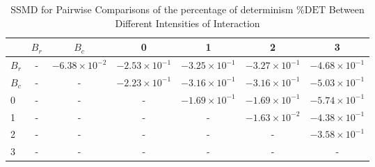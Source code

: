 \begin{table*}[!t]
\caption{SSMD for Pairwise Comparisons of the percentage of determinism $\%\text{DET}$ Between Different Intensities of Interaction\label{tab:ssmd_det}}
\centering
\begin{tabular}{lcccccc}
\toprule
 & $B_r$ & $B_c$ & 0 & 1 & 2 & 3 \\
\midrule
$B_r$ & - & $-6.38 \times 10^{-2}$ & $-2.53 \times 10^{-1}$ & $-3.25 \times 10^{-1}$ & $-3.27 \times 10^{-1}$ & $-4.68 \times 10^{-1}$ \\
$B_c$ & - & - & $-2.23 \times 10^{-1}$ & $-3.16 \times 10^{-1}$ & $-3.16 \times 10^{-1}$ & $-5.03 \times 10^{-1}$ \\
0 & - & - & - & $-1.69 \times 10^{-1}$ & $-1.69 \times 10^{-1}$ & $-5.74 \times 10^{-1}$ \\
1 & - & - & - & - & $-1.63 \times 10^{-2}$ & $-4.38 \times 10^{-1}$ \\
2 & - & - & - & - & - & $-3.58 \times 10^{-1}$ \\
3 & - & - & - & - & - & - \\
\bottomrule
\end{tabular}
\end{table*}
